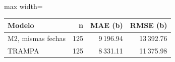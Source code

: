 \begin{center}\small\setlength{\tabcolsep}{4pt}
\begin{adjustbox}{max width=\textwidth}\begin{tabular}{lrrr}
\toprule
Modelo & n & MAE (b) & RMSE (b) \\ \midrule
M2, mismas fechas & 125 & 9\,196.94 & 13\,392.76 \\
TRAMPA & 125 & 8\,331.11 & 11\,375.98 \\
\bottomrule\end{tabular}\end{adjustbox}\end{center}

